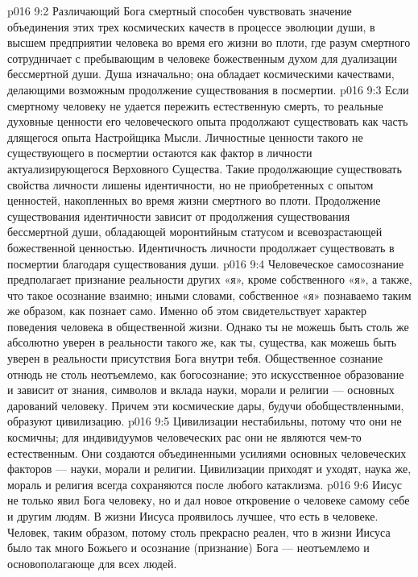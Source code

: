 \vs p016 9:2 Различающий Бога смертный способен чувствовать значение объединения этих трех космических качеств в процессе эволюции души, в высшем предприятии человека во время его жизни во плоти, где разум смертного сотрудничает с пребывающим в человеке божественным духом для дуализации бессмертной души. Душа  изначально; она обладает космическими качествами, делающими возможным продолжение существования в посмертии.
\vs p016 9:3 Если смертному человеку не удается пережить естественную смерть, то реальные духовные ценности его человеческого опыта продолжают существовать как часть длящегося опыта Настройщика Мысли. Личностные ценности такого не существующего в посмертии остаются как фактор в личности актуализирующегося Верховного Существа. Такие продолжающие существовать свойства личности лишены идентичности, но не приобретенных с опытом ценностей, накопленных во время жизни смертного во плоти. Продолжение существования идентичности зависит от продолжения существования бессмертной души, обладающей моронтийным статусом и всевозрастающей божественной ценностью. Идентичность личности продолжает существовать в посмертии благодаря существования души.
\vs p016 9:4 \pc Человеческое самосознание предполагает признание реальности других «я», кроме собственного «я», а также, что такое осознание взаимно; иными словами, собственное «я» познаваемо таким же образом, как познает само. Именно об этом свидетельствует характер поведения человека в общественной жизни. Однако ты не можешь быть столь же абсолютно уверен в реальности такого же, как ты, существа, как можешь быть уверен в реальности присутствия Бога внутри тебя. Общественное сознание отнюдь не столь неотъемлемо, как богосознание; это искусственное образование и зависит от знания, символов и вклада науки, морали и религии --- основных дарований человеку. Причем эти космические дары, будучи обобществленными, образуют цивилизацию.
\vs p016 9:5 Цивилизации нестабильны, потому что они не космичны; для индивидуумов человеческих рас они не являются чем\hyp{}то естественным. Они создаются объединенными усилиями основных человеческих факторов --- науки, морали и религии. Цивилизации приходят и уходят, наука же, мораль и религия всегда сохраняются после любого катаклизма.
\vs p016 9:6 Иисус не только явил Бога человеку, но и дал новое откровение о человеке самому себе и другим людям. В жизни Иисуса проявилось лучшее, что есть в человеке. Человек, таким образом, потому столь прекрасно реален, что в жизни Иисуса было так много Божьего и осознание (признание) Бога --- неотъемлемо и основополагающе для всех людей.
